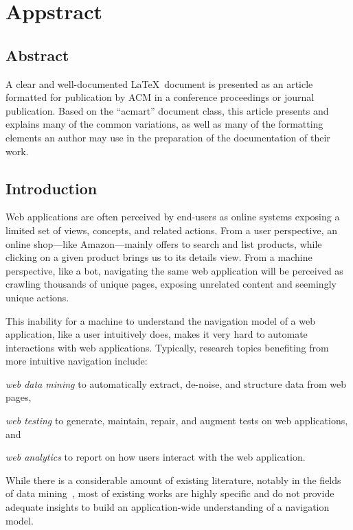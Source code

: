\chapter{Appstract}
\section{Abstract}
  A clear and well-documented \LaTeX\ document is presented as an
  article formatted for publication by ACM in a conference proceedings
  or journal publication. Based on the ``acmart'' document class, this
  article presents and explains many of the common variations, as well
  as many of the formatting elements an author may use in the
  preparation of the documentation of their work.

\section{Introduction}
Web applications are often perceived by end-users as online systems exposing a limited set of views, concepts, and related actions.
From a user perspective, an online shop---like Amazon---mainly offers to search and list products, while clicking on a given product brings us to its details view. 
From a machine perspective, like a bot, navigating the same web application will be perceived as crawling thousands of unique pages, exposing unrelated content and seemingly unique actions.

This inability for a machine to understand the navigation model of a web application, like a user intuitively does, makes it very hard to automate interactions with web applications.
Typically, research topics benefiting from more intuitive navigation include:
\begin{inparaenum}[\it (a)]
    \item \emph{web data mining} to automatically extract, de-noise, and structure data from web pages,
    \item \emph{web testing} to generate, maintain, repair, and augment tests on web applications, and
    \item \emph{web analytics} to report on how users interact with the web application.
\end{inparaenum}

While there is a considerable amount of existing literature, notably in the fields of data mining~\cite{Zhai2005WebAlignment, ArasuExtractingPages, Crescenzi2001RoadRunner:Sites, Sarawagi1996InformationExtraction, ChaudhariTemplatePages, MiaoExtractingClustering}, most of existing works are highly specific and do not provide adequate insights to build an application-wide understanding of a navigation model.

